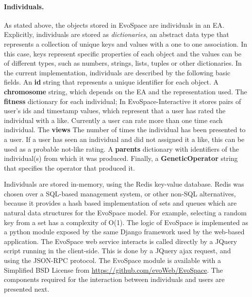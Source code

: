 \documentclass{sig-alternate}
\begin{document}
\paragraph{Individuals.} %
As stated above, the objects stored in EvoSpace are individuals in an EA.
Explicitly, individuals are stored as \emph{dictionaries}, an abstract data type that represents a collection of unique keys and values with a one to one association. In this case, keys represent specific properties of each object and the values can be of different types, such as
numbers, strings, lists, tuples or other dictionaries.
In the current implementation, individuals are described by the following basic fields.
An \textbf{id} string that represents a unique identifier for each object.
A \textbf{chromosome} string, which depends on the EA and the representation used.
The \textbf{fitness} dictionary for each individual; In EvoSpace-Interactive it stores pairs of user's ids and timestamp values, which represent that a user has rated the individual with a like. Currently a user can rate more than one time each individual.
The \textbf{views} The number of times the individual has been presented to a user. If a user has seen an individual and  did not assigned it a like, this can be used as a probable not-like rating.
A \textbf{parents} dictionary with identifiers of the individual(s) from which it was produced.
Finally, a \textbf{GeneticOperator}  string that specifies the operator that produced it.   


Individuals are stored in-memory, using the Redis key-value database. Redis was chosen over a SQL-based management system, or other non-SQL alternatives, because it provides a hash based implementation of sets and queues which are natural data structures for the EvoSpace model. For example, selecting a random key from a set has a complexity of O(1). The logic of EvoSpace is implemented as a python module exposed by the same Django framework used by the web-based application. The EvoSpace web service interacts is called directly by a JQuery script running in the client-side. This is done by a JQuery ajax request, and using the  JSON-RPC protocol.  The EvoSpace module is available with a Simplified BSD License from \url{https://github.com/evoWeb/EvoSpace}.  The components required for the interaction between individuals and users are presented next.
\end{document}
